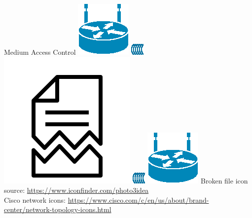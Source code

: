 \documentclass{beamer}
\begin{document}
\begin{frame}{Medium Access Control}
    \vspace*{1.81cm}
	\includegraphics[width=0.2\linewidth]{wireless.eps}
	\includegraphics[width=0.2\linewidth,angle=180,origin=c]{wave.eps}
	\includegraphics[width=0.16\linewidth]{error.png}
	\includegraphics[width=0.2\linewidth]{wave.eps}
	\includegraphics[width=0.2\linewidth]{wireless.eps}
    \vspace*{1.8cm}
    \center
    \begingroup
        \fontsize{3pt}{3pt}\selectfont
        \center
        Broken file icon source: \url{https://www.iconfinder.com/photo3idea} \\
        Cisco network icons: \url{https://www.cisco.com/c/en/us/about/brand-center/network-topology-icons.html} \\
    \endgroup
\end{frame}
\end{document}
